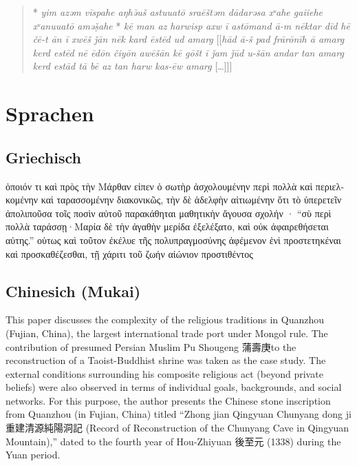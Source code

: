 \documentclass[
  english,
  a4paper,
  DIV=12,
  footlines=2.1,
  usegeometry=true]{scrartcl}
\newcommand{\textgreek}[2][]{\foreignlanguage{greek}{#2}}
\begin{document}
\begin{quote}
\leavevmode\marginpar{\textcolor{parnum}{{[}5{]}}}* {\emph{yim azǝm
vīspahe aŋhǝ̄uš astuuatō sraēštǝm dādarǝsa xᵛahe gaiiehe xᵛanuuatō
amǝṣ̌ahe}} * \emph{kē man az harwisp axw ī astōmand ā-m nēktar dīd hē
čē-t ān ī xwēš ǰān nēk kard ēstēd ud amarg} {{[}{[}\emph{hād ā-š pad
frārōnīh ā amarg kerd estēd nē ēdōn čiyōn awēšān kē gōšt ī ǰam ǰūd u-šān
andar tan amarg kerd estād tā bē az tan harw kas-ēw amarg}
{[}\ldots{]}{]}{]}}
\end{quote}

\hypertarget{sprachen}{%
\section{Sprachen}\label{sprachen}}

\hypertarget{griechisch}{%
\subsection{Griechisch}\label{griechisch}}

\leavevmode\marginpar{\textcolor{parnum}{{[}6{]}}}\textgreek{ὁποιόν τι
καὶ πρὸς τὴν Μάρθαν εἰπεν ὁ σωτὴρ ἀσχολουμένην περὶ πολλὰ καὶ
περιελκομένην καὶ ταρασσομένην διακονικῶς, τὴν δὲ ἀδελφὴν αἰτιωμένην ὅτι
τὸ ὑπερετεῖν ἀπολιποῦσα τοῖς ποσὶν αὐτοῦ παρακάθηται μαθητικὴν ἄγουσα
σχολήν · ``σὺ περὶ πολλὰ ταράσσῃ·Μαρία δὲ τὴν ἀγαθὴν μερίδα ἐξελέξατο,
καὶ οὐκ ἀφαιρεθήσεται αὐτης.'' οὑτως καὶ τοῦτον ἐκέλυε τῆς
πολυπραγμοσύνης ἀφέμενον ἑνὶ προστετηκέναι καὶ προσκαθέζεσθαι, τῇ χάριτι
τοῦ ζωήν αἰώνιον προστιθέντος}

\hypertarget{chinesich-mukai}{%
\subsection{Chinesich (Mukai)}\label{chinesich-mukai}}

\leavevmode\marginpar{\textcolor{parnum}{{[}7{]}}}This paper discusses
the complexity of the religious traditions in Quanzhou (Fujian, China),
the largest international trade port under Mongol rule. The contribution
of presumed Persian Muslim Pu Shougeng 蒲壽庚to the reconstruction of a
Taoist-Buddhist shrine was taken as the case study. The external
conditions surrounding his composite religious act (beyond private
beliefs) were also observed in terms of individual goals, backgrounds,
and social networks. For this purpose, the author presents the Chinese
stone inscription from Quanzhou (in Fujian, China) titled ``Zhong jian
Qingyuan Chunyang dong ji 重建清源純陽洞記 (Record of Reconstruction of
the Chunyang Cave in Qingyuan Mountain),'' dated to the fourth year of
Hou-Zhiyuan 後至元 (1338) during the Yuan period.
\end{document}
